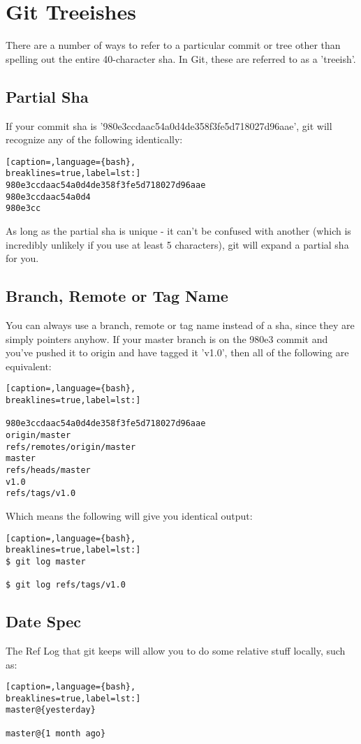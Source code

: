 \section{Git Treeishes}
There are a number of ways to refer to a particular commit or tree other than
spelling out the entire 40-character sha. In Git, these are referred to as a
'treeish'.

\subsection{Partial Sha}
If your commit sha is '980e3ccdaac54a0d4de358f3fe5d718027d96aae', git will
recognize any of the following identically:
\lstset{basicstyle=\scriptsize, numbers=none, captionpos=b, tabsize=4}
\begin{lstlisting}[caption=,language={bash},
breaklines=true,label=lst:]
980e3ccdaac54a0d4de358f3fe5d718027d96aae
980e3ccdaac54a0d4
980e3cc
\end{lstlisting}

As long as the partial sha is unique - it can't be confused with another (which
is incredibly unlikely if you use at least 5 characters), git will expand a
partial sha for you.

\subsection{Branch, Remote or Tag Name}
You can always use a branch, remote or tag name instead of a sha, since they
are simply pointers anyhow. If your master branch is on the 980e3 commit and
you've pushed it to origin and have tagged it 'v1.0', then all of the following
are equivalent:
\lstset{basicstyle=\scriptsize, numbers=none, captionpos=b, tabsize=4}
\begin{lstlisting}[caption=,language={bash},
breaklines=true,label=lst:]

980e3ccdaac54a0d4de358f3fe5d718027d96aae
origin/master
refs/remotes/origin/master
master
refs/heads/master
v1.0
refs/tags/v1.0
\end{lstlisting}

Which means the following will give you identical output:
\lstset{basicstyle=\scriptsize, numbers=none, captionpos=b, tabsize=4}
\begin{lstlisting}[caption=,language={bash},
breaklines=true,label=lst:]
$ git log master

$ git log refs/tags/v1.0
\end{lstlisting}

\subsection{Date Spec}
The Ref Log that git keeps will allow you to do some relative stuff locally,
such as:
\lstset{basicstyle=\scriptsize, numbers=none, captionpos=b, tabsize=4}
\begin{lstlisting}[caption=,language={bash},
breaklines=true,label=lst:]
master@{yesterday}

master@{1 month ago}
\end{lstlisting}

